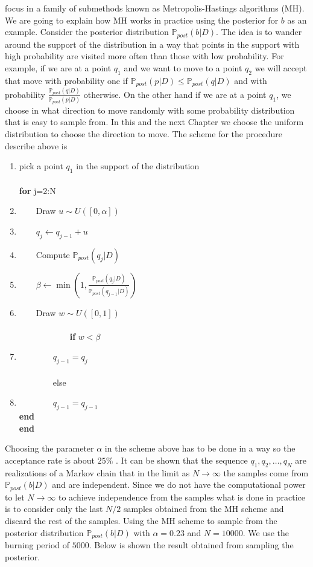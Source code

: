 \documentclass[12pt]{book}
\newcommand{\post}{\mathbb{P}_{post}}
\begin{document}
focus in a family of submethods known as Metropolis-Hastings algorithms (MH). We are going to explain
how MH works in practice using the posterior for $b$ as an example. 
\newline
\newline
Consider the posterior distribution $\post(b|D)$. The idea is to wander around the support of the distribution
in a way that points in the support with high probability are visited more often than those with low 
probability. For example, if we are at a point $q_{1}$ and we want to move to a point $q_{2}$ we will accept 
that move with probability one if $\post(p|D)\leq\post(q|D)$ and with probability 
$\frac{\post(q|D)}{\post(p|D)}$ otherwise. On the other hand if we are at a point $q_{1}$, we choose
in what direction to move randomly with some probability distribution that is easy to sample from.
In this and the next Chapter we choose the uniform distribution to choose the direction to move.
The scheme for the procedure describe above is 

\begin{enumerate}
\item pick a point $q_{1}$ in the support of the distribution\\
\\
\textbf{for} j=2:N
\item $\qquad$Draw $u\sim U([0,\alpha])$
\item $\qquad q_{j}\leftarrow q_{j-1}+u$
\item $\qquad$Compute $\post(q_{j}|D)$
\item $\qquad\beta\leftarrow\min(1,\frac{\post(q_{j}|D)}{\post(q_{j-1}|D)})$
\item $\qquad$Draw $w\sim U([0,1])$\\
\\
$\qquad\qquad\qquad$\textbf{if} $w<\beta$ 
\item $\qquad\qquad q_{j-1}=q_{j}$\\
\\
$\qquad\qquad$else
\item
	$\qquad\qquad q_{j-1}=q_{j-1}$\\
\textbf{end}\\
\textbf{end}
\end{enumerate}

Choosing the parameter $\alpha$ in the scheme above has to be done in a way so the acceptance rate
is about $25\%$ \cite{casella2008monte}. It can be shown that the sequence $q_{1},q_{2},\ldots,q_{N}$
are realizations of a Markov chain that in the limit as $N\rightarrow\infty$ the samples come from
$\post(b|D)$ and are independent. Since we do not have the computational power to let $N\rightarrow\infty$
to achieve independence from the samples what is done in practice is to consider only
the last $N/2$ samples obtained from the MH scheme and discard the rest of the samples.
\newline
Using the MH scheme to sample from the posterior distribution $\post(b|D)$ with $\alpha=0.23$
and $N=10000$. We use the burning period of $5000$. Below is shown the result obtained
from sampling the posterior.
\end{document}
